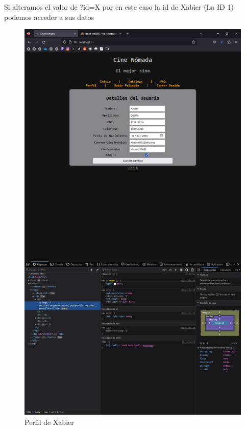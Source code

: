 \documentclass{report}
\begin{document}
                    Si alteramos el valor de ?id=X por en este caso la id de Xabier (La ID 1) podemos acceder a sus datos
                    \begin{figure}[H]
                        \centering
                        \includegraphics[width=\textwidth]{./img/vulnerabilidades/3.1/1.3.png}
                        \caption{Perfil de Xabier}
                    \end{figure}
\end{document}
